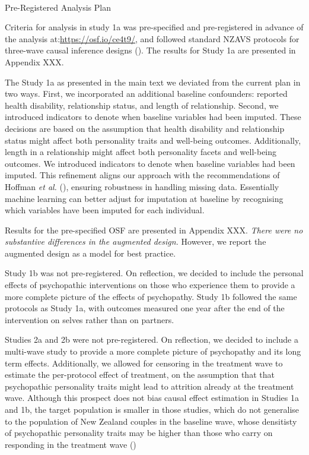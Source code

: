 \documentclass[
  singlecolumn]{article}
\makeatletter
\let\oldparagraph\paragraph
\renewcommand{\paragraph}{
    \@ifstar
      \xxxParagraphStar
      \xxxParagraphNoStar
  }
\newcommand{\xxxParagraphStar}[1]{\oldparagraph*{#1}\mbox{}}
\newcommand{\xxxParagraphNoStar}[1]{\oldparagraph{#1}\mbox{}}
\makeatother
\begin{document}
\paragraph{Pre-Registered Analysis
Plan}\label{pre-registered-analysis-plan}

Criteria for analysis in study 1a was pre-specified and pre-registered
in advance of the analysis at:\url{https://osf.io/ce4t9/}, and followed
standard NZAVS protocols for three-wave causal inference designs
(). The results for
Study 1a are presented in Appendix XXX.

The Study 1a as presented in the main text we deviated from the current
plan in two ways. First, we incorporated an additional baseline
confounders: reported health disability, relationship status, and length
of relationship. Second, we introduced indicators to denote when
baseline variables had been imputed. These decisions are based on the
assumption that health disability and relationship status might affect
both personality traits and well-being outcomes. Additionally, length in
a relationship might affect both personality facets and well-being
outcomes. We introduced indicators to denote when baseline variables had
been imputed. This refinement aligns our approach with the
recommendations of Hoffman \emph{et al.}
(), ensuring robustness in handling
missing data. Essentially machine learning can better adjust for
imputation at baseline by recognising which variables have been imputed
for each individual.

Results for the pre-specified OSF are presented in Appendix XXX.
\emph{There were no substantive differences in the augmented design.}
However, we report the augmented design as a model for best practice.

Study 1b was not pre-registered. On reflection, we decided to include
the personal effects of psychopathic interventions on those who
experience them to provide a more complete picture of the effects of
psychopathy. Study 1b followed the same protocols as Study 1a, with
outcomes measured one year after the end of the intervention on selves
rather than on partners.

Studies 2a and 2b were not pre-registered. On reflection, we decided to
include a multi-wave study to provide a more complete picture of
psychopathy and its long term effects. Additionally, we allowed for
censoring in the treatment wave to estimate the per-protocol effect of
treatment, on the assumption that that psychopathic personality traits
might lead to attrition already at the treatment wave. Although this
prospect does not bias causal effect estimation in Studies 1a and 1b,
the target population is smaller in those studies, which do not
generalise to the population of New Zealand couples in the baseline
wave, whose densitisty of psychopathic personality traits may be higher
than those who carry on responding in the treatment wave
()
\end{document}
